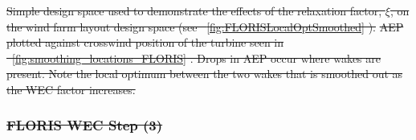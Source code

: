 \documentclass[a4paper]{jpconf}
\providecommand{\DIFdel}[1]{{\protect\color{red}\sout{#1}}}                      %
\providecommand{\DIFdelFL}[1]{\DIFdel{#1}} %
\begin{document}
{%
\DIFdelFL{Simple design space used to demonstrate the effects of the relaxation factor, $\xi$, on the wind farm layout design space (see \mbox{%
\cref{fig:FLORISLocalOptSmoothed}}\hspace{0pt}%
).}}
\DIFdelFL{\hspace{1pc}
	}%
{%
\DIFdelFL{AEP plotted against crosswind position of the turbine seen in \mbox{%
\cref{fig:smoothing_locations_FLORIS}}\hspace{0pt}%
. Drops in AEP occur where wakes are present. Note the local optimum between the two wakes that is smoothed out as the WEC factor increases.}}

\subsubsection{\DIFdel{FLORIS WEC Step (3)}}
\addtocounter{subsubsection}{-1}%
\end{document}

